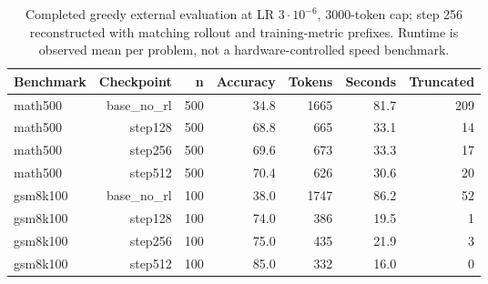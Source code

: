 \begin{table}[t]
\centering
\caption{Completed greedy external evaluation at LR $3\cdot10^{-6}$, 3000-token cap; step 256 reconstructed with matching rollout and training-metric prefixes. Runtime is observed mean per problem, not a hardware-controlled speed benchmark.}
\label{tab:latest}
\footnotesize
\setlength{\tabcolsep}{4pt}
\begin{tabular}{lrrrrrr}
\toprule
Benchmark & Checkpoint & n & Accuracy & Tokens & Seconds & Truncated\\
\midrule
math500 & base\_no\_rl & 500 & 34.8 & 1665 & 81.7 & 209\\
math500 & step128 & 500 & 68.8 & 665 & 33.1 & 14\\
math500 & step256 & 500 & 69.6 & 673 & 33.3 & 17\\
math500 & step512 & 500 & 70.4 & 626 & 30.6 & 20\\
gsm8k100 & base\_no\_rl & 100 & 38.0 & 1747 & 86.2 & 52\\
gsm8k100 & step128 & 100 & 74.0 & 386 & 19.5 & 1\\
gsm8k100 & step256 & 100 & 75.0 & 435 & 21.9 & 3\\
gsm8k100 & step512 & 100 & 85.0 & 332 & 16.0 & 0\\
\bottomrule
\end{tabular}
\end{table}
